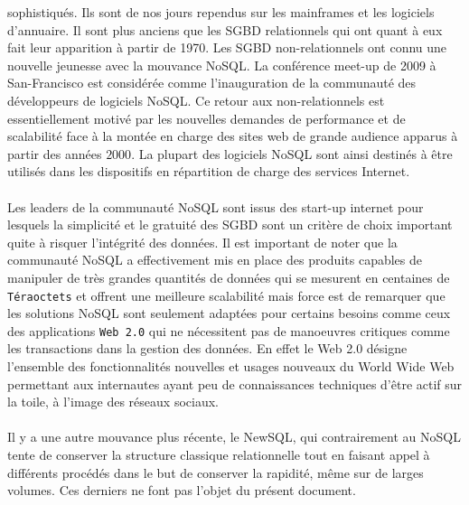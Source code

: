 sophistiqués\cite{BDDR}. Ils sont de nos jours rependus sur les mainframes et les
logiciels d'annuaire. Il sont plus anciens que les \textsf{SGBD}
relationnels qui ont quant à eux fait leur apparition à partir de 1970\cite{BDDR}. Les
\textsf{SGBD} non-relationnels ont connu une nouvelle jeunesse avec la
mouvance \textsf{NoSQL}. La conférence meet-up de 2009
à \textsf{San-Francisco} est considérée comme l'inauguration de la
communauté des développeurs de logiciels \textsf{NoSQL}. Ce retour aux
non-relationnels est essentiellement motivé par les nouvelles demandes
de performance et de scalabilité face à la montée en charge des sites
web de grande audience apparus à partir des années $2000$. La plupart des
logiciels \textsf{NoSQL} sont ainsi destinés à être utilisés dans les
dispositifs en répartition de charge des services \textsf{Internet}.
\\ 
\\ 
Les leaders de la communauté \textsf{NoSQL} sont issus
des \textsf{start-up} internet pour lesquels la simplicité et le
gratuité des \textsf{SGBD} sont un critère de choix important quite à
risquer l'intégrité des données. Il est important de noter que la
communauté
\textsf{NoSQL} a effectivement mis en place des produits capables de
manipuler de très grandes quantités de données qui se mesurent en
centaines de \texttt{Téraoctets} et offrent une meilleure scalabilité
mais force est de remarquer que les solutions \textsf{NoSQL} sont
seulement adaptées pour certains besoins comme ceux des applications
\texttt{Web 2.0} qui ne nécessitent pas de manoeuvres critiques comme
les transactions dans la gestion des données.  En effet le \textsf{Web
2.0} désigne l'ensemble des fonctionnalités nouvelles et usages
nouveaux du \textsf{World Wide Web} permettant aux internautes ayant
peu de connaissances techniques d’être actif sur la toile, à l’image
des réseaux sociaux.
\\
\\ 
Il y a une autre mouvance plus récente, le
\textsf{NewSQL}, qui contrairement au \textsf{NoSQL}
tente de conserver la structure classique relationnelle tout en
faisant appel à différents procédés dans le but de conserver la
rapidité, même sur de larges volumes\cite{newSQL}. Ces derniers ne
font pas l'objet du présent document.
